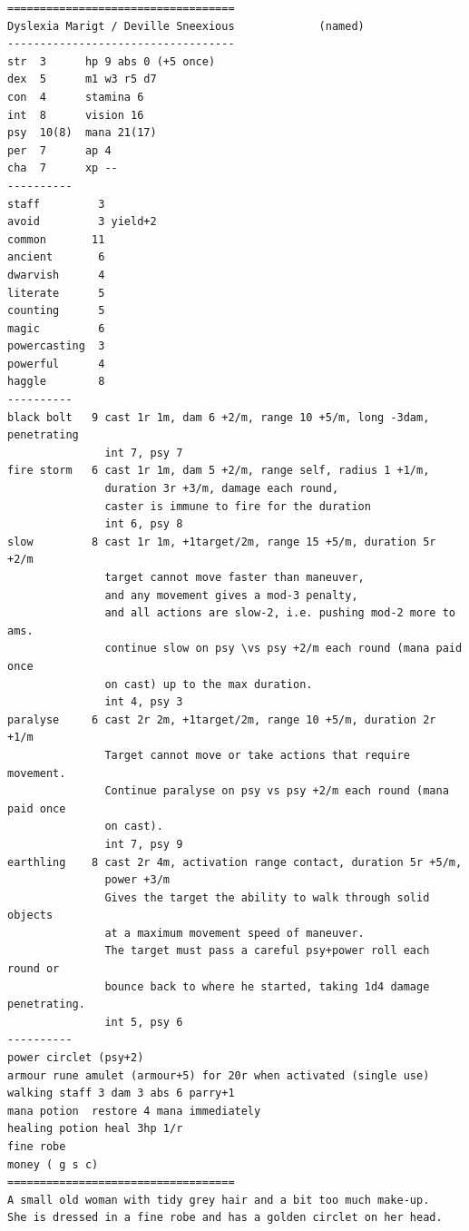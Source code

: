 \goodbreak \begin{samepage} \vsmall \begin{verbatim}
===================================
Dyslexia Marigt / Deville Sneexious             (named)
-----------------------------------
str  3      hp 9 abs 0 (+5 once)
dex  5      m1 w3 r5 d7
con  4      stamina 6
int  8      vision 16
psy  10(8)  mana 21(17)
per  7      ap 4
cha  7      xp --
----------
staff         3
avoid         3 yield+2
common       11
ancient       6
dwarvish      4
literate      5
counting      5
magic         6
powercasting  3
powerful      4
haggle        8
----------
black bolt   9 cast 1r 1m, dam 6 +2/m, range 10 +5/m, long -3dam, penetrating
               int 7, psy 7
fire storm   6 cast 1r 1m, dam 5 +2/m, range self, radius 1 +1/m,
               duration 3r +3/m, damage each round,
               caster is immune to fire for the duration
               int 6, psy 8
slow         8 cast 1r 1m, +1target/2m, range 15 +5/m, duration 5r +2/m
               target cannot move faster than maneuver,
               and any movement gives a mod-3 penalty,
               and all actions are slow-2, i.e. pushing mod-2 more to ams.
               continue slow on psy \vs psy +2/m each round (mana paid once
               on cast) up to the max duration.
               int 4, psy 3
paralyse     6 cast 2r 2m, +1target/2m, range 10 +5/m, duration 2r +1/m
               Target cannot move or take actions that require movement.
               Continue paralyse on psy vs psy +2/m each round (mana paid once
               on cast).
               int 7, psy 9
earthling    8 cast 2r 4m, activation range contact, duration 5r +5/m,
               power +3/m
               Gives the target the ability to walk through solid objects
               at a maximum movement speed of maneuver.
               The target must pass a careful psy+power roll each round or
               bounce back to where he started, taking 1d4 damage penetrating.
               int 5, psy 6
----------
power circlet (psy+2)
armour rune amulet (armour+5) for 20r when activated (single use)
walking staff 3 dam 3 abs 6 parry+1
mana potion  restore 4 mana immediately
healing potion heal 3hp 1/r
fine robe
money ( g s c)
===================================
A small old woman with tidy grey hair and a bit too much make-up.
She is dressed in a fine robe and has a golden circlet on her head.
\end{verbatim} \normalsize \end{samepage}

